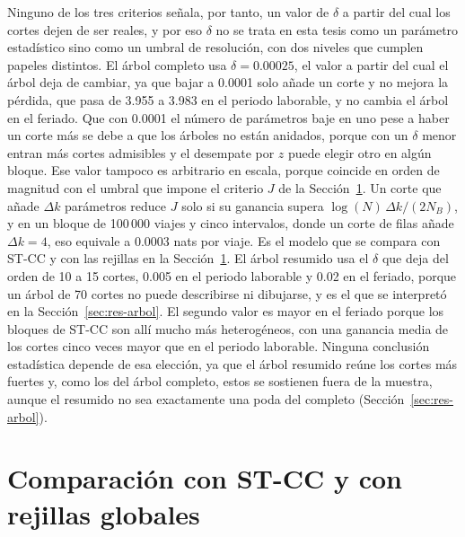 Ninguno de los tres criterios señala, por tanto, un valor de $\delta$ a partir del
cual los cortes dejen de ser reales, y por eso $\delta$ no se trata en esta tesis
como un parámetro estadístico sino como un umbral de resolución, con dos niveles
que cumplen papeles distintos. El árbol completo usa $\delta = 0.00025$, el valor
a partir del cual el árbol deja de cambiar, ya que bajar a 0.0001 solo añade un
corte y no mejora la pérdida, que pasa de 3.955 a 3.983 en el periodo laborable, y
no cambia el árbol en el feriado. Que con 0.0001 el número de parámetros baje en
uno pese a haber un corte más se debe a que los árboles no están anidados, porque
con un $\delta$ menor entran más cortes admisibles y el desempate por $z$ puede
elegir otro en algún bloque. Ese valor tampoco es arbitrario en escala, porque
coincide en orden de magnitud con el umbral que impone el criterio $J$ de la
Sección~\ref{sec:res-comparacion}. Un corte que añade $\Delta k$ parámetros
reduce $J$ solo si su ganancia supera $\log(N)\,\Delta k/(2N_B)$, y en un bloque
de 100\,000 viajes y cinco intervalos, donde un corte de filas añade
$\Delta k = 4$, eso equivale a 0.0003 nats por viaje. Es el modelo que se compara con ST-CC y con las
rejillas en la Sección~\ref{sec:res-comparacion}. El árbol resumido usa el
$\delta$ que deja del orden de 10 a 15 cortes, 0.005 en el periodo laborable y
0.02 en el feriado, porque un árbol de 70 cortes no puede describirse ni
dibujarse, y es el que se interpretó en la Sección~\ref{sec:res-arbol}. El segundo
valor es mayor en el feriado porque los bloques de ST-CC son allí mucho más
heterogéneos, con una ganancia media de los cortes cinco veces mayor que en el
periodo laborable. Ninguna conclusión estadística depende de esa elección, ya que
el árbol resumido reúne los cortes más fuertes y, como los del árbol completo,
estos se sostienen fuera de la muestra, aunque el resumido no sea exactamente una
poda del completo (Sección~\ref{sec:res-arbol}).

\section{Comparación con ST-CC y con rejillas globales}\label{sec:res-comparacion}

